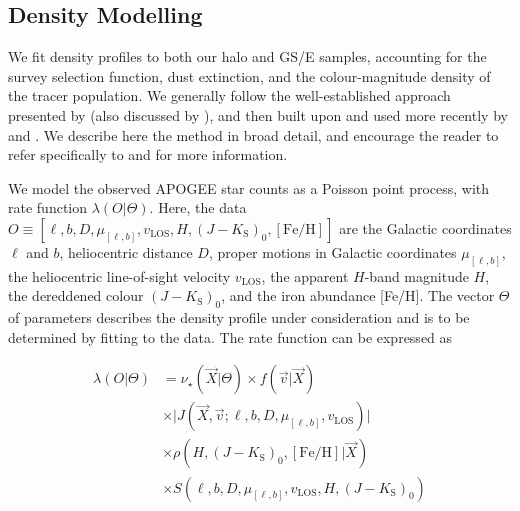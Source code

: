 \subsection{Density Modelling}

We fit density profiles to both our halo and GS/E samples, accounting for the survey selection function, dust extinction, and the colour-magnitude density of the tracer population. We generally follow the well-established approach presented by \textcite{bovy12d} (also discussed by \textcite{rix13}), and then built upon and used more recently by \textcite{bovy16a,bovy16b,mackereth17,horta21b} and \cite{mackereth20}. We describe here the method in broad detail, and encourage the reader to refer specifically to \textcite{bovy12d,bovy16a} and \cite{mackereth20} for more information.

We model the observed APOGEE star counts as a Poisson point process, with rate function $\lambda(O \vert \Theta)$. Here, the data $O \equiv [\ell, b, D, \mu_{[\ell,b]}, v_\mathrm{LOS}, H, (J-K_\mathrm{S})_{0}, [\mathrm{Fe/H}]]$ are the Galactic coordinates $\ell$ and $b$, heliocentric distance $D$, proper motions in Galactic coordinates $\mu_{[\ell,b]}$, the heliocentric line-of-sight velocity $v_\mathrm{LOS}$, the apparent $H$-band magnitude $H$, the dereddened colour $(J-K_\mathrm{S})_{0}$, and the iron abundance [Fe/H]. The vector $\Theta$ of parameters describes the density profile under consideration and is to be determined by fitting to the data. The rate function can be expressed as

\begin{equation}
\label{ch3:eq:rate}
\begin{split}
	\lambda(O \vert \Theta) & = \nu_{\star}(\vec{X} \vert \Theta) \times f(\vec{v} \vert \vec{X}) \\
	& \times \vert J(\vec{X}, \vec{v}; \ell, b, D, \mu_{[\ell,b]}, v_\mathrm{LOS}) \vert \\
	& \times \rho(H, (J-K_\mathrm{S})_{0}, [\mathrm{Fe/H}] \vert \vec{X}) \\
	& \times S(\ell, b, D, \mu_{[\ell,b]}, v_\mathrm{LOS}, H, (J-K_\mathrm{S})_{0})
\end{split}
\end{equation}

